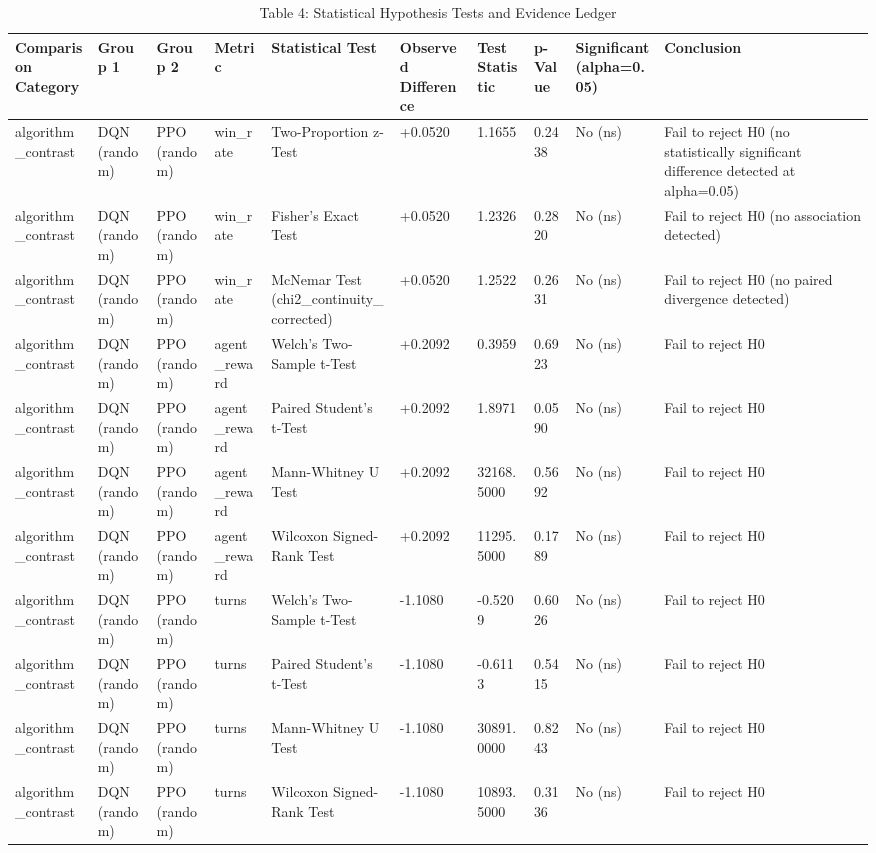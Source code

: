 \begin{table}
\caption{Table 4: Statistical Hypothesis Tests and Evidence Ledger}
\label{tab:table_statistical_results}
\begin{tabular}{llllllllll}
\toprule
Comparison Category & Group 1 & Group 2 & Metric & Statistical Test & Observed Difference & Test Statistic & p-Value & Significant (alpha=0.05) & Conclusion \\
\midrule
algorithm\_contrast & DQN (random) & PPO (random) & win\_rate & Two-Proportion z-Test & +0.0520 & 1.1655 & 0.2438 & No (ns) & Fail to reject H0 (no statistically significant difference detected at alpha=0.05) \\
algorithm\_contrast & DQN (random) & PPO (random) & win\_rate & Fisher's Exact Test & +0.0520 & 1.2326 & 0.2820 & No (ns) & Fail to reject H0 (no association detected) \\
algorithm\_contrast & DQN (random) & PPO (random) & win\_rate & McNemar Test (chi2\_continuity\_corrected) & +0.0520 & 1.2522 & 0.2631 & No (ns) & Fail to reject H0 (no paired divergence detected) \\
algorithm\_contrast & DQN (random) & PPO (random) & agent\_reward & Welch's Two-Sample t-Test & +0.2092 & 0.3959 & 0.6923 & No (ns) & Fail to reject H0 \\
algorithm\_contrast & DQN (random) & PPO (random) & agent\_reward & Paired Student's t-Test & +0.2092 & 1.8971 & 0.0590 & No (ns) & Fail to reject H0 \\
algorithm\_contrast & DQN (random) & PPO (random) & agent\_reward & Mann-Whitney U Test & +0.2092 & 32168.5000 & 0.5692 & No (ns) & Fail to reject H0 \\
algorithm\_contrast & DQN (random) & PPO (random) & agent\_reward & Wilcoxon Signed-Rank Test & +0.2092 & 11295.5000 & 0.1789 & No (ns) & Fail to reject H0 \\
algorithm\_contrast & DQN (random) & PPO (random) & turns & Welch's Two-Sample t-Test & -1.1080 & -0.5209 & 0.6026 & No (ns) & Fail to reject H0 \\
algorithm\_contrast & DQN (random) & PPO (random) & turns & Paired Student's t-Test & -1.1080 & -0.6113 & 0.5415 & No (ns) & Fail to reject H0 \\
algorithm\_contrast & DQN (random) & PPO (random) & turns & Mann-Whitney U Test & -1.1080 & 30891.0000 & 0.8243 & No (ns) & Fail to reject H0 \\
algorithm\_contrast & DQN (random) & PPO (random) & turns & Wilcoxon Signed-Rank Test & -1.1080 & 10893.5000 & 0.3136 & No (ns) & Fail to reject H0 \\

\end{tabular}
\end{table}
